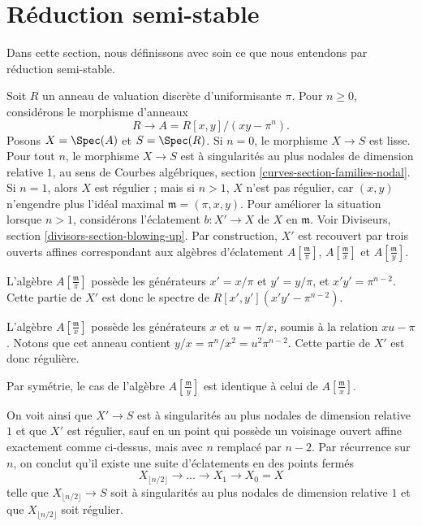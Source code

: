 \section{Réduction semi-stable}
\label{section-semistable-reduction}

\noindent
Dans cette section, nous définissons avec soin ce que nous entendons par
réduction semi-stable.

\begin{example}
\label{example-blowup}
Soit $R$ un anneau de valuation discrète d'uniformisante $\pi$.
Pour $n\geq0$, considérons le morphisme d'anneaux
$$
R \longrightarrow A = R[x, y]/(xy - \pi^n).
$$
Posons $X=\Spec(A)$ et $S=\Spec(R)$. Si $n=0$, le morphisme
$X\to S$ est lisse. Pour tout $n$, le morphisme $X\to S$ est à
singularités au plus nodales de dimension relative $1$, au sens de Courbes
algébriques, section \ref{curves-section-families-nodal}. Si $n=1$, alors
$X$ est régulier ; mais si $n>1$, $X$ n'est pas régulier, car $(x,y)$
n'engendre plus l'idéal maximal $\mathfrak m=(\pi,x,y)$. Pour améliorer la
situation lorsque $n>1$, considérons l'éclatement
$b:X'\to X$ de $X$ en $\mathfrak m$. Voir Diviseurs, section
\ref{divisors-section-blowing-up}. Par construction, $X'$ est recouvert par
trois ouverts affines correspondant aux algèbres d'éclatement
$A[\frac{\mathfrak m}{\pi}]$, $A[\frac{\mathfrak m}{x}]$ et
$A[\frac{\mathfrak m}{y}]$.

\medskip\noindent
L'algèbre $A[\frac{\mathfrak m}{\pi}]$ possède les générateurs
$x'=x/\pi$ et $y'=y/\pi$, et $x'y'=\pi^{n-2}$. Cette partie de $X'$ est
donc le spectre de $R[x',y'](x'y'-\pi^{n-2})$.

\medskip\noindent
L'algèbre $A[\frac{\mathfrak m}{x}]$ possède les générateurs $x$ et
$u=\pi/x$, soumis à la relation $xu-\pi$. Notons que cet anneau contient
$y/x=\pi^n/x^2=u^2\pi^{n-2}$. Cette partie de $X'$ est donc régulière.

\medskip\noindent
Par symétrie, le cas de l'algèbre $A[\frac{\mathfrak m}{y}]$ est identique
à celui de $A[\frac{\mathfrak m}{x}]$.

\medskip\noindent
On voit ainsi que $X'\to S$ est à singularités au plus nodales de dimension
relative $1$ et que $X'$ est régulier, sauf en un point qui possède un
voisinage ouvert affine exactement comme ci-dessus, mais avec $n$ remplacé
par $n-2$. Par récurrence sur $n$, on conclut qu'il existe une suite
d'éclatements en des points fermés
$$
X_{\lfloor n/2 \rfloor} \to \ldots \to X_1 \to X_0 = X
$$
telle que $X_{\lfloor n/2 \rfloor}\to S$ soit à singularités au plus
nodales de dimension relative $1$ et que
$X_{\lfloor n/2 \rfloor}$ soit régulier.
\end{example}

